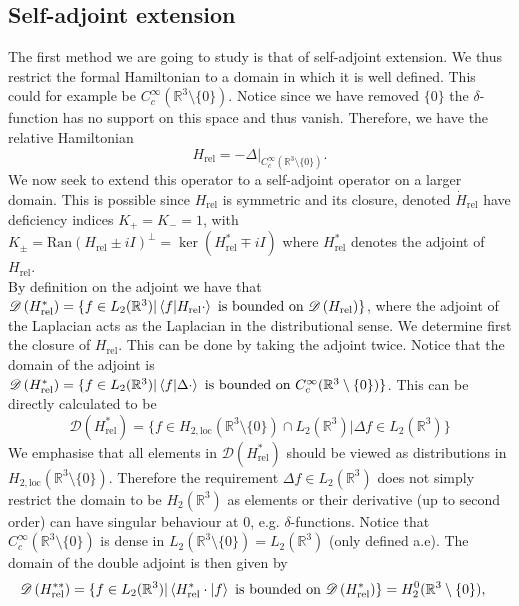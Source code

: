 \documentclass[a4paper,11pt]{article}
\newcommand{\dom}[1]{\mathscr D\left(#1\right)}
\newcommand{\R}{\mathbb{R}}
\begin{document}
\subsection{Self-adjoint extension}
The first method we are going to study is that of self-adjoint extension. We thus restrict the formal Hamiltonian to a domain in which it is well defined. This could for example be $ C_c^\infty(\mathbb{R}^3\setminus\{0\}) $. Notice since we have removed $ \{0\} $ the $ \delta $-function has no support on this space and thus vanish. Therefore, we have the relative Hamiltonian \begin{equation}
H_{\text{rel}}=-\Delta\rvert_{C_c^\infty(\mathbb{R}^3\setminus\{0\})}.
\end{equation}
We now seek to extend this operator to a self-adjoint operator on a larger domain. This is possible since $ H_{\text{rel}} $ is symmetric and its closure, denoted $ \dot{H}_{\text{rel}} $ have deficiency indices $ K_+=K_-=1 $, with $ K_\pm=\text{Ran}(H_{\text{rel}}\pm iI)^\perp=\ker(H_{\text{rel}}^*\mp iI) $ where $ H_{\text{rel}}^* $ denotes the adjoint of $ H_{\text{rel}} $. \\
By definition on the adjoint we have that $ \dom{H_{\text{rel}}^*}=\{f\in L_2(\R^3)\rvert \braket{f|H_{\text{rel}}\cdot} \text{ is bounded on }\dom{H_{\text{rel}}}\} $, where the adjoint of the Laplacian acts as the Laplacian in the distributional sense. We determine first the closure of $ H_{\text{rel}} $. This can be done by taking the adjoint twice. Notice that the domain of the adjoint is $ \dom{H_{\text{rel}}^*}=\{f\in L_2(\R^3)\rvert \braket{f|\Delta\cdot} \text{ is bounded on }C_c^\infty(\R^3\setminus\{0\})\} $. This can be directly calculated to be \begin{equation}
\dom{H_{\text{rel}}^*}=\{f\in H_{2,\text{loc}}(\R^3\setminus\{0\})\cap L_2(\R^3)\rvert \Delta f \in L_2(\R^3)\}
\end{equation}
We emphasise that all elements in $ \dom{H_{\text{rel}}^*} $ should be viewed as distributions in $ H_{2,\text{loc}}(\R^3\setminus\{0\}) $. Therefore the requirement $ \Delta f\in L_2(\R^3) $ does not simply restrict the domain to be $ H_2(\R^3) $ as elements or their derivative (up to second order) can have singular behaviour at $ 0 $, e.g. $ \delta $-functions.
 Notice that $ C_c^\infty(\mathbb{R}^3\setminus\{0\}) $ is dense in $ L_2(\mathbb{R}^3\setminus\{0\})=L_2(\R^3) $ (only defined a.e).  The domain of the double adjoint is then given by \begin{equation}\begin{aligned}
\dom{H_{\text{rel}}^{**}}&=\{f\in L_2(\R^3)\rvert \braket{H_{\text{rel}}^*\cdot|f} \text{ is bounded on }\dom{H_{\text{rel}}^*}\}=H^0_2(\R^3\setminus\{0\}),
\end{aligned}
\end{equation} 
\end{document}
